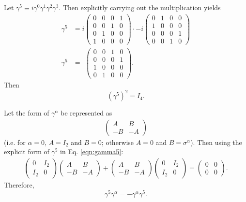  \label{ssc:gamma52}

Let $\gamma^5\equiv i\gamma^0 \gamma^1 \gamma^2 \gamma^3$. Then explicitly
carrying out the
multiplication yields
\begin{align} \nonumber
\gamma^5&=i
\begin{pmatrix}
0 & 0 & 0 & 1\\
0 & 0 & 1 & 0\\
0 & 1 & 0 & 0\\
1 & 0 & 0 & 0
\end{pmatrix}
\cdot -i
\begin{pmatrix}
0 & 1 & 0 & 0\\
1 & 0 & 0 & 0\\
0 & 0 & 0 & 1\\
0 & 0 & 1 & 0
\end{pmatrix}
\\ \label{eqn:gamma5}
\gamma^5 &= \ \,
\begin{pmatrix}
0 & 0 & 1 & 0\\
0 & 0 & 0 & 1\\
1 & 0 & 0 & 0 \\
0 & 1 & 0 & 0
\end{pmatrix}.
\end{align}
Then
\begin{equation}\label{eqn:gamma52}
(\gamma^5)^2=I_4.
\end{equation}

\label{ssc:gamma5Anticommutator}

Let the form of $\gamma^\alpha$ be represented as
\begin{align*}
\begin{pmatrix}
A & B\\
-B & -A
\end{pmatrix}
\end{align*}
(i.e. for $\alpha=0$, $A=I_2$ and $B=0$; otherwise $A=0$ and $B=\sigma^\alpha$).
Then using the
explicit form of $\gamma^5$ in Eq. \eqref{eqn:gamma5}:
\begin{align*}
\begin{pmatrix}
0 & I_2\\
I_2 & 0
\end{pmatrix}
\begin{pmatrix}
A & B\\
-B & -A
\end{pmatrix}
+
\begin{pmatrix}
A & B\\
-B & -A
\end{pmatrix}
\begin{pmatrix}
0 & I_2\\
I_2 & 0
\end{pmatrix}
=
\begin{pmatrix}
0 & 0\\
0 & 0
\end{pmatrix}
.
\end{align*}
Therefore, 
\begin{equation}\label{eqn:gamma5Anticommutator}
\gamma^5 \gamma^\alpha=-\gamma^\alpha \gamma^5.
\end{equation}

